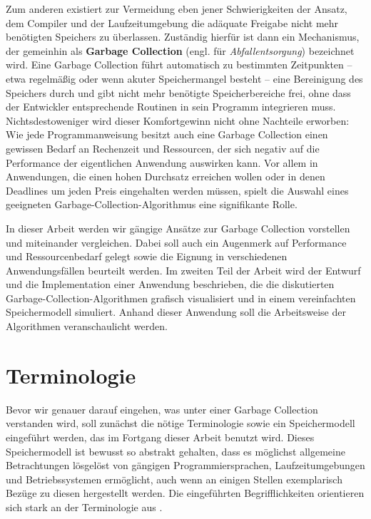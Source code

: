 Zum anderen existiert zur Vermeidung eben jener Schwierigkeiten der Ansatz, dem Compiler und der Laufzeitumgebung die adäquate Freigabe nicht mehr benötigten Speichers zu überlassen.
Zuständig hierfür ist dann ein Mechanismus, der gemeinhin als \textbf{Garbage Collection} (engl. für \textit{Abfallentsorgung}) bezeichnet wird.
Eine Garbage Collection führt automatisch zu bestimmten Zeitpunkten -- etwa regelmäßig oder wenn akuter Speichermangel besteht -- eine Bereinigung des Speichers durch und gibt nicht mehr benötigte Speicherbereiche frei, ohne dass der Entwickler entsprechende Routinen in sein Programm integrieren muss.
Nichtsdestoweniger wird dieser Komfortgewinn nicht ohne Nachteile erworben:
Wie jede Programmanweisung besitzt auch eine Garbage Collection einen gewissen Bedarf an Rechenzeit und Ressourcen, der sich negativ auf die Performance der eigentlichen Anwendung auswirken kann.
Vor allem in Anwendungen, die einen hohen Durchsatz erreichen wollen oder in denen Deadlines um jeden Preis eingehalten werden müssen, spielt die Auswahl eines geeigneten Garbage-Collection-Algorithmus eine signifikante Rolle.

In dieser Arbeit werden wir gängige Ansätze zur Garbage Collection vorstellen und miteinander vergleichen.
Dabei soll auch ein Augenmerk auf Performance und Ressourcenbedarf gelegt sowie die Eignung in verschiedenen Anwendungsfällen beurteilt werden.
Im zweiten Teil der Arbeit wird der Entwurf und die Implementation einer Anwendung beschrieben, die die diskutierten Garbage-Collection-Algorithmen grafisch visualisiert und in einem vereinfachten Speichermodell simuliert.
Anhand dieser Anwendung soll die Arbeitsweise der Algorithmen veranschaulicht werden.

\section{Terminologie}
\label{sec:intro:terminologie}
Bevor wir genauer darauf eingehen, was unter einer Garbage Collection verstanden wird, soll zunächst die nötige Terminologie sowie ein Speichermodell eingeführt werden, das im Fortgang dieser Arbeit benutzt wird.
Dieses Speichermodell ist bewusst so abstrakt gehalten, dass es möglichst allgemeine Betrachtungen lösgelöst von gängigen Programmiersprachen, Laufzeitumgebungen und Betriebssystemen ermöglicht, auch wenn an einigen Stellen exemplarisch Bezüge zu diesen hergestellt werden.
Die eingeführten Begrifflichkeiten orientieren sich stark an der Terminologie aus \cite[Kap. 1]{jones-lins}.

